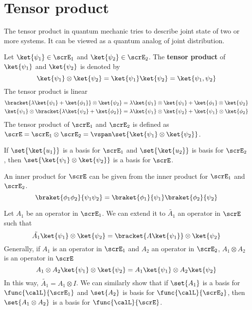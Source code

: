 \section{Tensor product}
The tensor product in quantum mechanic tries to describe joint state of two or more systems. It can be viewed as a quantum analog of joint distribution.

Let \(\ket{\psi_1} \in \scrE_1\) and \(\ket{\psi_2} \in \scrE_2\). The \textbf{tensor product} of \(\ket{\psi_1}\) and \(\ket{\psi_2}\) is denoted by 
\begin{equation*}
    \ket{\psi_1} \otimes \ket{\psi_2} = \ket{\psi_1} \ket{\psi_2} = \ket{\psi_1, \psi_2}
\end{equation*}
The tensor product is linear
\begin{align*}
    \bracket{\lambda \ket{\psi_1} + \ket{\phi_1}} \otimes \ket{\psi_2} &= \lambda \ket{\psi_1} \otimes \ket{\psi_1} + \ket{\phi_1} \otimes \ket{\psi_2}\\
    \ket{\psi_1} \otimes \bracket{\lambda \ket{\psi_2} + \ket{\phi_2}} &= \lambda\ket{\psi_1} \otimes \ket{\psi_2} + \ket{\psi_1} \otimes \ket{\phi_2}\\
\end{align*}
The tensor product of \(\scrE_1\) and \(\scrE_2\) is defined as \(\scrE = \scrE_1 \otimes \scrE_2 = \vspan \set{\ket{\psi_1} \otimes \ket{\psi_2}}\).

\begin{proposition}
    If \(\set{\ket{u_1}}\) is a basis for \(\scrE_1\) and \(\set{\ket{u_2}}\) is basis for \(\scrE_2\), then \(\set{\ket{\psi_1} \otimes \ket{\psi_2}}\) is a basis for \(\scrE\).
\end{proposition}
\begin{definition}
    An inner product for \(\scrE\) can be given from the inner product for \(\scrE_1\) and \(\scrE_2\).
    \begin{equation*}
        \braket{\phi_1 \phi_2}{\psi_1 \psi_2} = \braket{\phi_1}{\psi_1} \braket{\phi_2}{\psi_2}
    \end{equation*}
\end{definition}
Let \(A_1\) be an operator in \(\scrE_1\). We can extend it to \(\tilde{A_1}\) an operator in \(\scrE\) such that 
\begin{equation*}
    \tilde{A_1} \ket{\psi_1} \otimes \ket{\psi_2} = \bracket{A \ket{\psi_1}} \otimes \ket{\psi_2}
\end{equation*}
Generally, if \(A_1\) is an operator in \(\scrE_1\) and \(A_2\) an operator in \(\scrE_2\), \(A_1 \otimes A_2\) is an operator in \(\scrE\) 
\begin{equation*}
    A_1 \otimes A_2 \ket{\psi_1} \otimes \ket{\psi_2} = A_1 \ket{\psi_1} \otimes A_2 \ket{\psi_2}
\end{equation*}
In this way, \(\tilde{A_1} = A_1 \otimes I\).  We can similarly show that if \(\set{A_1}\) is a basis for \(\func{\calL}{\scrE_1}\) and \(\set{A_2}\) is basis for \(\func{\calL}{\scrE_2}\), then \(\set{A_1 \otimes A_2}\) is a basis for \(\func{\calL}{\scrE}\).

